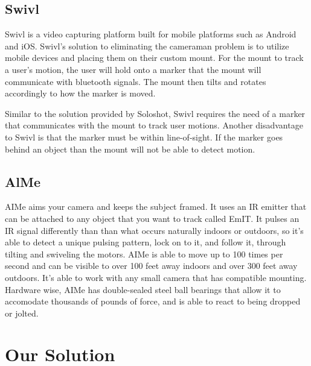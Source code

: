 \documentclass[12pt]{article}
\begin{document}
\subsection{Swivl}
Swivl is a video capturing platform built for mobile platforms such as Android and iOS. Swivl’s solution to eliminating the cameraman problem is to utilize mobile devices and placing them on their custom mount. For the mount to track a user’s motion, the user will hold onto a marker that the mount will communicate with bluetooth signals. The mount then tilts and rotates accordingly to how the marker is moved.
\par
Similar to the solution provided by Soloshot, Swivl requires the need of a marker that communicates with the mount to track user motions. Another disadvantage to Swivl is that the marker must be within line-of-sight. If the marker goes behind an object than the mount will not be able to detect motion.

\subsection{AlMe}
AIMe aims your camera and keeps the subject framed. It uses an IR emitter that can be attached to any object that you want to track called EmIT. It pulses an IR signal differently than than what occurs naturally indoors or outdoors, so it's able to detect a unique pulsing pattern, lock on to it, and follow it, through tilting and swiveling the motors. AIMe is able to move up to 100 times per second and can be visible to over 100 feet away indoors and over 300 feet away outdoors. It's able to work with any small camera that has compatible mounting. Hardware wise, AIMe has double-sealed steel ball bearings that allow it to accomodate thousands of pounds of force, and is able to react to being dropped or jolted.

\section{Our Solution}
\end{document}
